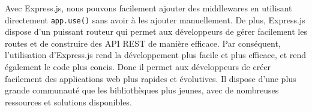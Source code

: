 \documentclass[12pt]{article}
\begin{document}
\begin{itemize}
                  Avec Express.js, nous pouvons facilement ajouter des middlewares en
                  utilisant directement \texttt{app.use()} sans avoir à les ajouter
                  manuellement. De plus, Express.js dispose d'un puissant routeur qui
                  permet aux développeurs de gérer facilement les routes et de
                  construire des API REST de manière efficace. Par conséquent,
                  l'utilisation d'Express.js rend la développement plus facile et plus
                  efficace, et rend également le code plus concis. Donc il permet aux
                  développeurs de créer facilement des applications web plus rapides et
                  évolutives. Il dispose d'une plus grande communauté que les
                  bibliothèques plus jeunes, avec de nombreuses ressources et solutions
                  disponibles.
      \end{itemize}

      \newpage
\end{document}
